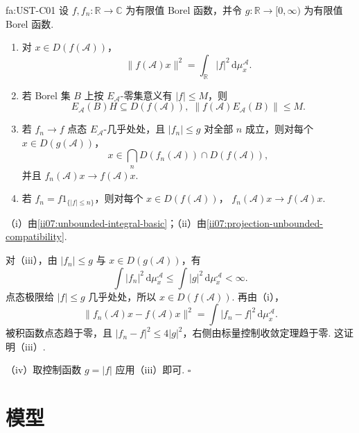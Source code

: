 \begin{FAProposition}[C][无界函数演算的谱估计与控制收敛]{fa:UST-C01}
设 \(\displaystyle f,f_n:\mathbb R\to\mathbb C\) 为有限值 Borel 函数，并令 \(\displaystyle g:\mathbb R\to[0,\infty)\) 为有限值 Borel 函数.
\begin{enumerate}[label=\textnormal{(\roman*)}]
\item 对 \(\displaystyle x\in D(f(\mathcal A))\)，
\[
\|f(\mathcal A)x\|^2
=
\int_{\mathbb R}|f|^2\,\mathrm{d}\mu_x^{\mathcal A}.
\]
\item 若 Borel 集 \(\displaystyle B\) 上按 \(\displaystyle E_{\mathcal A}\)-零集意义有 \(\displaystyle|f|\leqslant M\)，则
\[
E_{\mathcal A}(B)H\subseteq D(f(\mathcal A)),
\;
\|f(\mathcal A)E_{\mathcal A}(B)\|\leqslant M.
\]
\item 若 \(\displaystyle f_n\to f\) 点态 \(\displaystyle E_{\mathcal A}\)-几乎处处，且 \(\displaystyle|f_n|\leqslant g\) 对全部 \(\displaystyle n\) 成立，则对每个 \(\displaystyle x\in D(g(\mathcal A))\)，
\[
x\in\bigcap_nD(f_n(\mathcal A))\cap D(f(\mathcal A)),
\]
并且
\(\displaystyle f_n(\mathcal A)x\to f(\mathcal A)x.\)
\item 若 \(\displaystyle f_n=f1_{\{|f|\leqslant n\}}\)，则对每个 \(\displaystyle x\in D(f(\mathcal A))\)，
\(\displaystyle f_n(\mathcal A)x\to f(\mathcal A)x.\)
\end{enumerate}
\end{FAProposition}

\begin{FAProof}
（i）由\autoref{ii07:unbounded-integral-basic}；（ii）由\autoref{ii07:projection-unbounded-compatibility}.

对（iii），由 \(\displaystyle|f_n|\leqslant g\) 与 \(\displaystyle x\in D(g(\mathcal A))\)，有
\[
\int|f_n|^2\,\mathrm{d}\mu_x^{\mathcal A}
\leqslant
\int|g|^2\,\mathrm{d}\mu_x^{\mathcal A}<\infty.
\]
点态极限给 \(\displaystyle|f|\leqslant g\) 几乎处处，所以 \(\displaystyle x\in D(f(\mathcal A))\). 再由（i），
\[
\|f_n(\mathcal A)x-f(\mathcal A)x\|^2
=
\int|f_n-f|^2\,\mathrm{d}\mu_x^{\mathcal A}.
\]
被积函数点态趋于零，且 \(\displaystyle|f_n-f|^2\leqslant4|g|^2\)，右侧由标量控制收敛定理趋于零. 这证明（iii）.

（iv）取控制函数 \(\displaystyle g=|f|\) 应用（iii）即可.
\hfill\(\square\)
\end{FAProof}

\section{模型}\label{sec:ii07-models}

